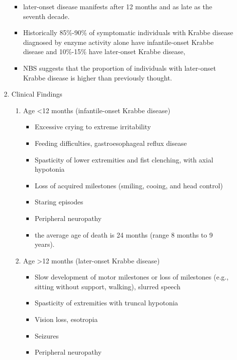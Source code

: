 \documentclass{scrartcl}
\begin{document}
\begin{enumerate}
\begin{enumerate}
\begin{itemize}
\item later-onset disease manifests after 12 months and as late as the
seventh decade.

\item Historically 85\%-90\% of symptomatic individuals with Krabbe disease
diagnosed by enzyme activity alone have infantile-onset Krabbe
disease and 10\%-15\% have later-onset Krabbe disease,

\item NBS suggests that the proportion of individuals with later-onset
Krabbe disease is higher than previously thought.
\end{itemize}

\item Clinical Findings
\label{sec:org12b51e2}

\begin{enumerate}
\item Age <12 months (infantile-onset Krabbe disease)
\label{sec:org4cdfcef}

\begin{itemize}
\item Excessive crying to extreme irritability
\item Feeding difficulties, gastroesophageal reflux disease
\item Spasticity of lower extremities and fist clenching, with axial hypotonia
\item Loss of acquired milestones (smiling, cooing, and head control)
\item Staring episodes
\item Peripheral neuropathy
\item the average age of death is 24 months (range 8 months to 9 years).
\end{itemize}

\item Age >12 months (later-onset Krabbe disease)
\label{sec:org5b845b1}

\begin{itemize}
\item Slow development of motor milestones or loss of milestones (e.g.,
sitting without support, walking), slurred speech
\item Spasticity of extremities with truncal hypotonia
\item Vision loss, esotropia
\item Seizures
\item Peripheral neuropathy
\end{itemize}
\end{enumerate}
\end{enumerate}


\end{enumerate}
\end{document}
